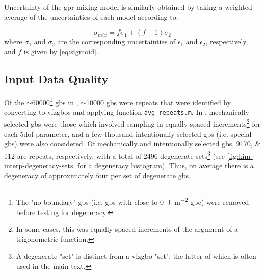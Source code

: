 \documentclass[preprint,12pt]{elsarticle}
\begin{document}
	Uncertainty of the \gls{gpr} mixing model is similarly obtained by taking a weighted average of the uncertainties of each model according to:
	
	\begin{equation}
		\sigma_{mix} = f \sigma_1+(f-1) \sigma_2
		\label{eq:gprmix-sigma}
	\end{equation}
	where $\sigma_1$ and $\sigma_2$ are the corresponding uncertainties of $\epsilon_1$ and $\epsilon_2$, respectively, and $f$ is given by \cref{eq:sigmoid}. 
	
	\subsection{Input Data Quality}
	\label{sec:supp:kim-interp:quality}
	Of the $\sim$\num{60000}\footnote{The "no-boundary" \glspl{gb} (i.e. \glspl{gb} with close to \SI{0}{\joule\per\square\meter} \gls{gbe}) were removed before testing for degeneracy.} \glspl{gb} in \cite{kimPhasefieldModeling3D2014}, $\sim$\num{10000} \glspl{gb} were repeats that were identified by converting to \glspl{vfzgbo} and applying \vfzorepo{} function \texttt{avg\_repeats.m}. In \cite{kimPhasefieldModeling3D2014}, mechanically selected \glspl{gb} were those which involved sampling in equally spaced increments\footnote{In some cases, this was equally spaced increments of the argument of a trigonometric function.} for each \gls{5dof} parameter, and a few thousand intentionally selected \glspl{gb} (i.e. special \glspl{gb}) were also considered. Of mechanically and intentionally selected \glspl{gb}, \numlist{9170;112} are repeats, respectively, with a total of \num{2496} degenerate sets\footnote{A degenerate "set" is distinct from a \gls{vfzgbo} "set", the latter of which is often used in the main text.} (see \cref{fig:kim-interp-degeneracy-sets} for a degeneracy histogram). Thus, on average there is a degeneracy of approximately four per set of degenerate \glspl{gb}.
	
\end{document}
